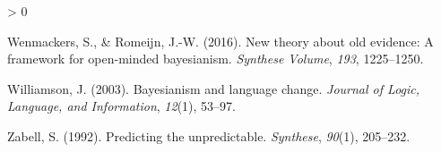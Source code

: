 \documentclass[
  11pt,
  dvipsnames,enabledeprecatedfontcommands]{scrartcl}
\newlength{\cslhangindent}
\newenvironment{CSLReferences}[2] %
 {%
  \setlength{\parindent}{0pt}
  \ifodd #1 \everypar{\setlength{\hangindent}{\cslhangindent}}\ignorespaces\fi
  \ifnum #2 > 0
  \setlength{\parskip}{#2\baselineskip}
  \fi
 }%
 {}
\begin{document}
\begin{CSLReferences}{1}{0}
\leavevmode\hypertarget{ref-wenmackersRomeijn2016}{}%
Wenmackers, S., \& Romeijn, J.-W. (2016). New theory about old evidence:
A framework for open-minded bayesianism. \emph{Synthese Volume},
\emph{193}, 1225--1250.

\leavevmode\hypertarget{ref-williamson2003}{}%
Williamson, J. (2003). Bayesianism and language change. \emph{Journal of
Logic, Language, and Information}, \emph{12}(1), 53--97.

\leavevmode\hypertarget{ref-zabell1992}{}%
Zabell, S. (1992). Predicting the unpredictable. \emph{Synthese},
\emph{90}(1), 205--232.

\end{CSLReferences}
\end{document}
